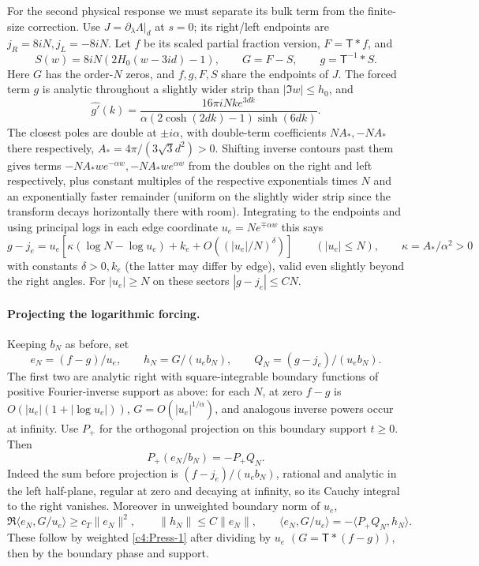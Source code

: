 For the second physical response we must separate its bulk term from the
finite-size correction. Use \(J=\partial_\lambda\Lambda|_d\) at
\(s=0\); its right/left endpoints are \(j_R=8iN,j_L=-8iN\). Let \(f\)
be its scaled partial fraction version, \(F=\mathsf T*f\), and
\[
      S(w)=8iN(2H_0(w-3id)-1),\qquad G=F-S,\qquad g=\mathsf T^{-1}*S.
\]
Here \(G\) has the order-\(N\) zeros, and \(f,g,F,S\) share the endpoints of \(J\). The forced term \(g\) is analytic throughout a slightly wider strip than \(|\Im w|\le h_0\), and
\[
 \widehat{g'}(k)=\frac{16\pi iN k e^{3dk}}{\alpha(2\cosh(2dk)-1)\sinh(6dk)} .
\]
The closest poles are double at \(\pm i\alpha\), with double-term coefficients \(N A_*, -N A_*\) there respectively, \(A_*=4\pi/(3\sqrt3 d^2)>0\). Shifting inverse contours past them gives terms \(-N A_* w e^{-\alpha w},-N A_* w e^{\alpha w}\) from the doubles on the right and left respectively, plus constant multiples of the respective exponentials times \(N\) and an exponentially faster remainder (uniform on the slightly wider strip since the transform decays horizontally there with room). Integrating to the endpoints and using principal logs in each edge coordinate \(u_e=N e^{\mp\alpha w}\) this says
\begin{equation}
      g-j_e=u_e\left[\kappa(\log N-\log u_e)+k_e+O((|u_e|/N)^\delta)\right]\qquad(|u_e|\le N),\qquad
      \kappa=A_*/\alpha^2>0                                                     \label{c4:Press-4}
\end{equation}
with constants \(\delta>0,k_e\) (the latter may differ by edge), valid even slightly beyond the right angles. For \(|u_e|\ge N\) on these sectors \(|g-j_e|\le C N\).

\paragraph{Projecting the logarithmic forcing.}
Keeping \(b_N\) as before, set
\[
              e_N=(f-g)/u_e,\qquad h_N=G/(u_e b_N),\qquad
              Q_N=(g-j_e)/(u_e b_N).
\]
The first two are analytic right with square-integrable boundary functions of positive Fourier-inverse support as above: for each \(N\), at zero \(f-g\) is \(O(|u_e|(1+|\log u_e|))\), \(G=O(|u_e|^{1/\alpha})\), and analogous inverse powers occur at infinity. Use \(P_+\) for the orthogonal projection on this boundary support \(t\ge0\). Then
\[
                       P_+(e_N/b_N)=-P_+ Q_N .
\]
Indeed the sum before projection is
\((f-j_e)/(u_e b_N)\), rational and analytic in the left half-plane,
regular at zero and decaying at infinity, so its Cauchy integral to the
right vanishes. Moreover in unweighted boundary norm of \(u_e\),
\[
 \Re\langle e_N,G/u_e\rangle\ge c_T\|e_N\|^2,\qquad
 \|h_N\|\le C\|e_N\|,\qquad \langle e_N,G/u_e\rangle=-\langle P_+Q_N,h_N\rangle .
\]
These follow by weighted \eqref{c4:Press-1} after dividing by \(u_e\) \((G=\mathsf T*(f-g))\), then by the boundary phase and support.

